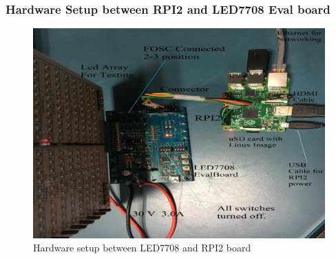 \subsubsection{Hardware Setup between RPI2 and LED7708 Eval board}
\begin{figure}[ht]
         \centering
         \includegraphics[scale=0.3]{images/raspberryledsetup.png}
         \caption{Hardware setup between LED7708 and RPI2 board}
\end{figure}
